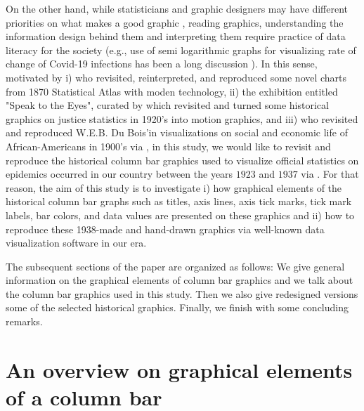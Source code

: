 On the other hand, while statisticians and graphic designers may have different priorities on what makes a good graphic \citep{gelman2013infovis,QK},  reading graphics, understanding the information design behind them and interpreting them require practice of data literacy for the society (e.g., use of semi logarithmic graphs for visualizing rate of change of Covid-19 infections has been a long discussion \citep{Significance}). In this sense, motivated by  i) \cite{vanderplas2019framed} who revisited, reinterpreted, and reproduced some novel charts from 1870 Statistical Atlas with moden technology, ii) the exhibition entitled "Speak to the Eyes", curated by \cite{Durmaz} which revisited and turned some historical graphics on justice statistics in 1920's into motion graphics, and  iii) \cite{matt} who revisited and reproduced W.E.B. Du Bois'in visualizations on social and economic life of  African-Americans in 1900's via , in this study, we would like to revisit and reproduce the historical column bar graphics used to visualize official statistics on epidemics occurred in our country between the years $1923$ and $1937$ via . For that reason, the aim of this study is to investigate  i) how graphical elements of the historical column bar graphs such as titles, axis lines, axis tick marks, tick mark labels, bar colors, and data values are presented on these graphics and ii) how to reproduce these 1938-made and hand-drawn graphics via well-known data visualization software  \citep{Wickham} in our era.  
	
The subsequent sections of the paper are organized as follows: We give general information on the graphical elements of column bar graphics and we talk about the column bar graphics used in this study. Then we also give redesigned versions some of the selected historical graphics. Finally, we finish with  some concluding remarks.


\section{An overview on graphical elements of a column bar}
\label{sec:overview}

